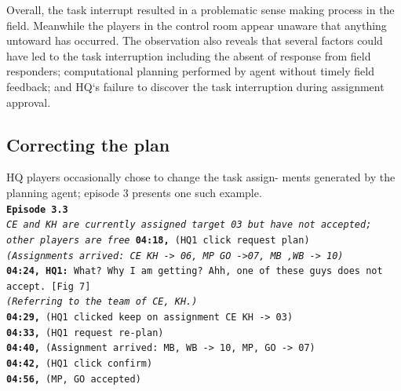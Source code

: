 Overall, the task interrupt resulted in a problematic sense making process in the field. Meanwhile the players in the control room appear unaware that anything untoward has occurred. The observation also reveals that several factors could have led to the task interruption including the absent of response from field responders; computational planning performed by agent without timely field feedback; and HQ`s failure to discover the task interruption during assignment approval. 


\subsection{Correcting the plan}
HQ players occasionally chose to change the task assign- ments generated by the planning agent; episode 3 presents one such example.\\

\noindent\texttt{\textbf{Episode 3.3}\\
\emph{CE and KH are currently assigned target 03 but have not accepted; other players are free}
\textbf{04:18,} (HQ1 click request plan)\\
\emph{(Assignments arrived: CE KH -> 06, MP GO ->07, MB ,WB -> 10)}\\
\textbf{04:24, HQ1:}  What? Why I am getting? Ahh, one of these guys does not accept. [Fig 7] \\
\emph{(Referring to the team of CE, KH.)}\\
\textbf{04:29,} (HQ1 clicked keep on assignment CE KH -> 03) \\
\textbf{04:33,} (HQ1 request re-plan)\\
\textbf{04:40,} (Assignment arrived: MB, WB -> 10, MP, GO -> 07)\\
\textbf{04:42,} (HQ1 click confirm)\\
\textbf{04:56,} (MP, GO accepted)\\
}

